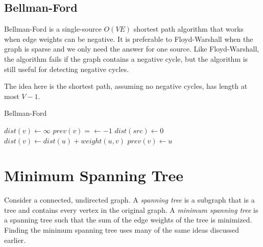 \subsection{Bellman-Ford}

Bellman-Ford is a single-source $O(VE)$ shortest path algorithm that works when edge weights can be negative. It is preferable to Floyd-Warshall when the graph is sparse and we only need the answer for one source. Like Floyd-Warshall, the algorithm fails if the graph contains a negative cycle, but the algorithm is still useful for detecting negative cycles.

The idea here is the shortest path, assuming no negative cycles, has length at most $V-1$.

\begin{algorithm}[H]
\caption{Bellman-Ford}
\begin{algorithmic}
	\State $dist(v)\gets\infty$
    \State $prev(v)=\gets -1$
\EndFor
\State $dist(src) \gets 0$
    	    \State $dist(v) \gets dist(u)+weight(u,v)$
	        \State $prev(v) \gets u$
        \EndIf
	\EndFor
\EndFor
{}
	\EndIf
\EndFor
\end{algorithmic}
\end{algorithm}

\section{Minimum Spanning Tree}

Consider a connected, undirected graph. A \textit{spanning tree} is a subgraph that is a tree and contains every vertex in the original graph. A \textit{minimum spanning tree} is a spanning tree such that the sum of the edge weights of the tree is minimized. Finding the minimum spanning tree uses many of the same ideas discussed earlier.

\begin{center}
\end{center}

